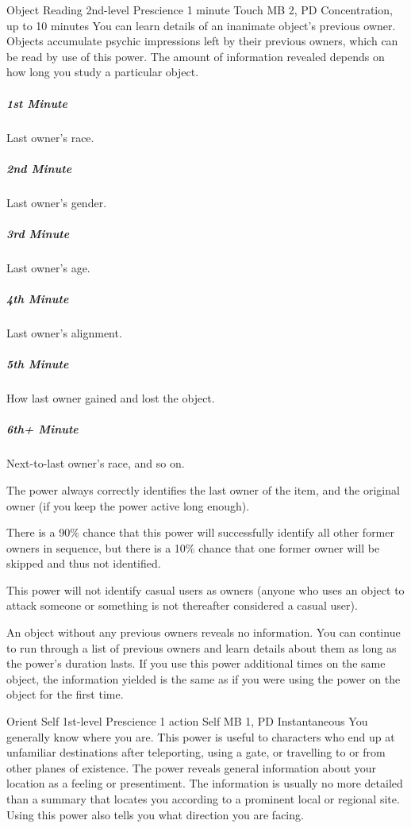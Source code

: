 \DndPowerHeader%
  {Object Reading}
  {2nd-level Prescience}
  {1 minute}
  {Touch}
  {MB 2, PD \lvltwo}
  {Concentration, up to 10 minutes}
You can learn details of an inanimate object's previous owner.
Objects accumulate psychic impressions
left by their previous owners,
which can be read by use of this power.
The amount of information revealed depends
on how long you study a particular object.

\subparagraph{1st Minute}
  Last owner's race.
\subparagraph{2nd Minute}
  Last owner's gender.
\subparagraph{3rd Minute}
  Last owner's age.
\subparagraph{4th Minute}
  Last owner's alignment.
\subparagraph{5th Minute}
  How last owner gained and lost the object.
\subparagraph{6th+ Minute}
  Next-to-last owner's race, and so on.

The power always correctly identifies the last owner of the item,
and the original owner
(if you keep the power active long enough).

There is a 90\% chance
that this power will successfully identify all other former owners
in sequence,
but there is a 10\% chance that one former owner
will be skipped and thus not identified.

This power will not identify casual users as owners
(anyone who uses an object to attack someone
or something is not thereafter considered a casual user).

An object without any previous owners reveals no information.
You can continue to run through a list of previous owners
and learn details about them as long as the power's duration lasts.
If you use this power additional times on the same object,
the information yielded is the same
as if you were using the power on the object for the first time.

\DndPowerHeader%
  {Orient Self}
  {1st-level Prescience}
  {1 action}
  {Self}
  {MB 1, PD \lvlone}
  {Instantaneous}
You generally know where you are.
This power is useful to characters who end up at unfamiliar destinations
after teleporting,
using a gate,
or travelling to or from other planes of existence.
The power reveals general information about your location
as a feeling or presentiment.
The information is usually no more detailed than a summary
that locates you according to a prominent local or regional site.
Using this power also tells you what direction you are facing.

